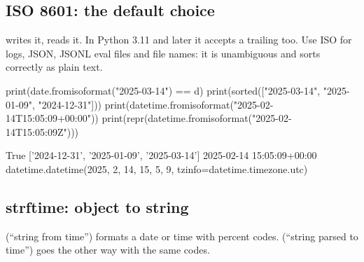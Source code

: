 \subsection{ISO 8601: the default choice}

 writes it,  reads it. In Python 3.11 and later it
accepts a trailing  too. Use ISO for logs, JSON, JSONL eval files and file names: it is
unambiguous and sorts correctly as plain text.

\begin{pycode}
print(date.fromisoformat("2025-03-14") == d)
print(sorted(["2025-03-14", "2025-01-09", "2024-12-31"]))
print(datetime.fromisoformat("2025-02-14T15:05:09+00:00"))
print(repr(datetime.fromisoformat("2025-02-14T15:05:09Z")))
\end{pycode}
\begin{rawcode}
True
['2024-12-31', '2025-01-09', '2025-03-14']
2025-02-14 15:05:09+00:00
datetime.datetime(2025, 2, 14, 15, 5, 9, tzinfo=datetime.timezone.utc)
\end{rawcode}

\subsection{strftime: object to string}

 (``string from time'') formats a date or time with percent codes.
 (``string parsed to time'') goes the other way with the same codes.

\begin{center}
\end{center}

